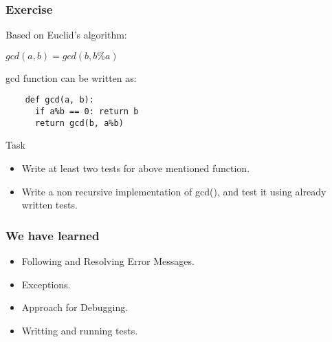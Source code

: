 \documentclass[compress,14pt]{beamer}
\newcounter{time}
\newcommand{\inctime}[1]{\addtocounter{time}{#1}{\vspace*{0.1in}\tiny \thetime\ m}}
\begin{document}
%
%
%
%

\begin{frame}[fragile]
    \frametitle{Exercise}
    Based on Euclid's algorithm:
    \begin{center}
    $gcd(a,b)=gcd(b,b\%a)$
    \end{center}
    gcd function can be written as:
    \begin{lstlisting}
    def gcd(a, b):
      if a%b == 0: return b
      return gcd(b, a%b)
    \end{lstlisting}
    \vspace*{-0.15in}
    \begin{block}{Task}
      \begin{itemize}
      \item Write at least 
        two tests for above mentioned function.
      \item Write a non recursive implementation
      of gcd(), and test it using already 
      written tests.
      \end{itemize}
    \end{block}
    
\inctime{15} 
\end{frame}

\begin{frame}
  \frametitle{We have learned}
  \begin{itemize}
  \item Following and Resolving Error Messages.
  \item Exceptions.
  \item Approach for Debugging.
  \item Writting and running tests.
  \end{itemize}
\end{frame}
\end{document}
